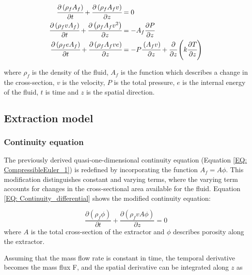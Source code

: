 \documentclass[a4paper,fleqn]{cas-dc}
\begin{document}
{\footnotesize
	\begin{align}
		\label{EQ: CompressibleEuler_1}
		\cfrac{\partial \left( \rho_f A_f \right) }{\partial t} + \cfrac{\partial \left( \rho_f A_f v \right)}{\partial z} &= 0 \\
		\cfrac{\partial \left( \rho_f v A_f \right) }{\partial t} + \cfrac{\partial \left( \rho_f A_f v^2 \right)}{\partial z} &= -A_f \cfrac{\partial P}{\partial z} \label{EQ: CompressibleEuler_2} \\
		\cfrac{\partial \left( \rho_f e A_f \right) }{\partial t} + \cfrac{\partial \left( \rho_f A_f v e\right)}{\partial z} &= -P\cfrac{\left( A_f v \right)}{\partial z} + \cfrac{\partial}{\partial z} \left( k \cfrac{\partial T}{\partial z} \right)   
		\label{EQ: CompressibleEuler_3}
	\end{align}  
}

where $\rho_f$ is the density of the fluid, $A_f$ is the function which describes a change in the cross-section, $v$ is the velocity, $P$ is the total pressure, $e$ is the internal energy of the fluid, $t$ is time and $z$ is the spatial direction.

\subsection{Extraction model} \label{CH: Extraction_model}
\subsubsection{Continuity equation} \label{CH: Continuity}

The previously derived quasi-one-dimensional continuity equation (Equation \ref{EQ: CompressibleEuler_1}) is redefined by incorporating the function $A_f = A\phi$. This modification distinguishes constant and varying terms, where the varying term accounts for changes in the cross-sectional area available for the fluid. Equation \ref{EQ: Continuity_differential} shows the modified continuity equation:

{\footnotesize
	\begin{equation} \label{EQ: Continuity_differential}
		\frac{\partial (\rho_f \phi)}{\partial t} + \frac{\partial (\rho_f v A\phi)}{\partial z} = 0
	\end{equation}
}
where $A$ is the total cross-section of the extractor and $\phi$ describes porosity along the extractor.

Assuming that the mass flow rate is constant in time, the temporal derivative becomes the mass flux F, and the spatial derivative can be integrated along $z$ as
\end{document}
